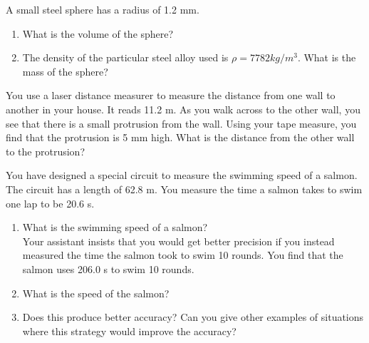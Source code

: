 \begin{problem}\label{problem_3_6}
    A small steel sphere has a radius of 1.2 mm. 
    \begin{enumerate}
        \item What is the volume of the sphere?
        \item The density of the particular steel alloy used is $\rho = 7782 kg/m^{3}$. What is the mass of the sphere?
    \end{enumerate}
\end{problem}


\begin{problem}[Laserlength]\label{problem_3_7}
    You use a laser distance measurer to measure the distance from one wall to another in your house. It reads 11.2 m. As you walk across to the other wall, you see that there is a small protrusion from the wall. Using your tape measure, you find that the protrusion is 5 mm high. What is the distance from the other wall to the protrusion?
\end{problem}


\begin{problem}\label{problem_3_8}
    You have designed a special circuit to measure the swimming speed of a salmon. The circuit has a length of 62.8 m. You measure the time a salmon takes to swim one lap to be 20.6 s.
    \begin{enumerate}
        \item What is the swimming speed of a salmon? \\
              Your assistant insists that you would get better precision if you instead measured the time the salmon took to swim 10 rounds. You find that the salmon uses 206.0 s to swim 10 rounds.
        \item What is the speed of the salmon?
        \item Does this produce better accuracy? Can you give other examples of situations where this strategy would improve the accuracy?
    \end{enumerate}
\end{problem}